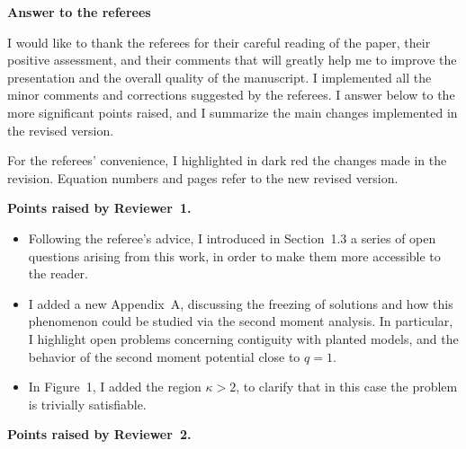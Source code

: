 \documentclass[a4paper,11pt]{article}
\begin{document}
\begin{center}
{\bf \Large Answer to the referees}
\end{center}

I would like to thank the referees for their careful reading of the paper, 
their positive assessment, and their comments that will greatly help me to improve the presentation and the overall quality of the manuscript. 
I implemented all the minor comments and corrections suggested by the referees. 
I answer below to the more significant points raised, and I summarize the main changes implemented in the revised version.

\myskip 
For the referees' convenience, I highlighted in dark red the changes made in the revision.
Equation numbers and pages refer to the new revised version.

\myskip 
\noindent\textbf{Points raised by Reviewer~1.}
\begin{itemize}
    \item Following the referee's advice, I introduced in Section~1.3 a series of open questions arising from this work, 
    in order to make them more accessible to the reader. 
    \item I added a new Appendix~A, discussing the freezing of solutions and how this phenomenon 
    could be studied via the second moment analysis. 
    In particular, I highlight open problems concerning contiguity with planted models, 
    and the behavior of the second moment potential close to $q=1$. 
    \item In Figure~1, I added the region $\kappa > 2$, to clarify that in this case the problem is trivially satisfiable.
\end{itemize}
\myskip 
\noindent\textbf{Points raised by Reviewer~2.}
\end{document}
